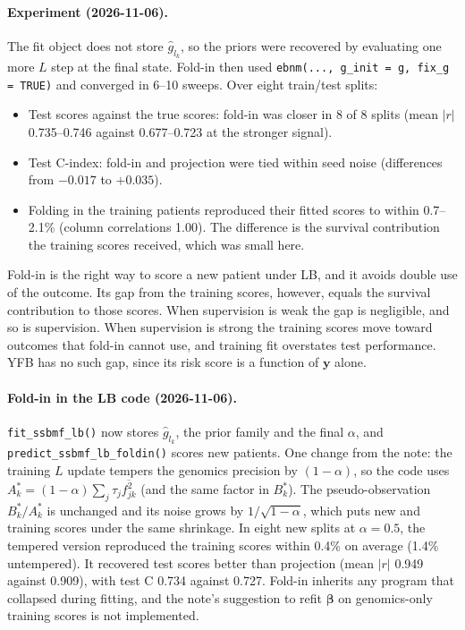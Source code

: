 \documentclass[11pt]{article}
\begin{document}
\paragraph{Experiment (2026-11-06).} The fit object does not store $\hat g_{l_k}$,
so the priors were recovered by evaluating one more $L$ step at the final state.
Fold-in then used \texttt{ebnm(..., g\_init = g, fix\_g = TRUE)} and converged in
6--10 sweeps. Over eight train/test splits:
\begin{itemize}
  \item Test scores against the true scores: fold-in was closer in 8 of 8 splits
        (mean $|r|$ 0.735--0.746 against 0.677--0.723 at the stronger signal).
  \item Test C-index: fold-in and projection were tied within seed noise
        (differences from $-0.017$ to $+0.035$).
  \item Folding in the training patients reproduced their fitted scores to
        within 0.7--2.1\% (column correlations 1.00). The difference is the
        survival contribution the training scores received, which was small
        here.
\end{itemize}

\begin{keybox}
Fold-in is the right way to score a new patient under LB, and it avoids
double use of the outcome. Its gap from the training scores, however, equals
the survival contribution to those scores. When supervision is weak the gap is
negligible, and so is supervision. When supervision is strong the training
scores move toward outcomes that fold-in cannot use, and training fit
overstates test performance. YFB has no such gap, since its risk score is a
function of $\bm y$ alone.
\end{keybox}

\paragraph{Fold-in in the LB code (2026-11-06).} \texttt{fit\_ssbmf\_lb()} now stores
$\hat g_{l_k}$, the prior family and the final $\alpha$, and
\texttt{predict\_ssbmf\_lb\_foldin()} scores new patients. One change from the note:
the training $L$ update tempers the genomics precision by $(1-\alpha)$, so the code
uses $A^*_k = (1-\alpha)\sum_j\tau_j\overline{f^2_{jk}}$ (and the same factor in
$B^*_k$). The pseudo-observation $B^*_k/A^*_k$ is unchanged and its noise grows by
$1/\sqrt{1-\alpha}$, which puts new and training scores under the same shrinkage. In
eight new splits at $\alpha = 0.5$, the tempered version reproduced the training
scores within 0.4\% on average (1.4\% untempered). It recovered test scores better
than projection (mean $|r|$ 0.949 against 0.909), with test C 0.734 against 0.727.
Fold-in inherits any program that collapsed during fitting, and the note's
suggestion to refit $\bm\beta$ on genomics-only training scores is not implemented.
\end{document}

